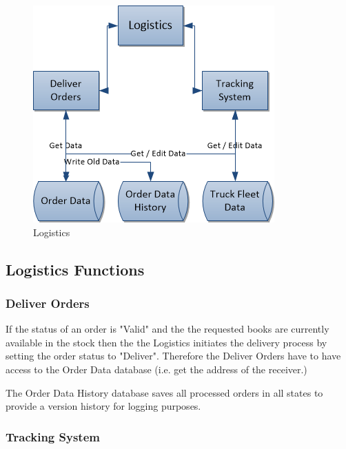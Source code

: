 \documentclass[11pt,a4paper,oneside,svgnames]{report}
\begin{document}
\begin{figure}[H]
 \begin{center}
  \includegraphics[width=\textwidth]{Logistics.png}
 \end{center}
 \caption{Logistics}
\end{figure}

\subsection{Logistics Functions}

\subsubsection{Deliver Orders}

If the status of an order is "Valid" and the the requested books are currently available in the stock then the the Logistics initiates the delivery process by setting the order status to "Deliver". Therefore the Deliver Orders have to have access to the Order Data database (i.e. get the address of the receiver.)

The Order Data History database saves all processed orders in all states to provide a version history for logging purposes.

\subsubsection{Tracking System}
\end{document}
